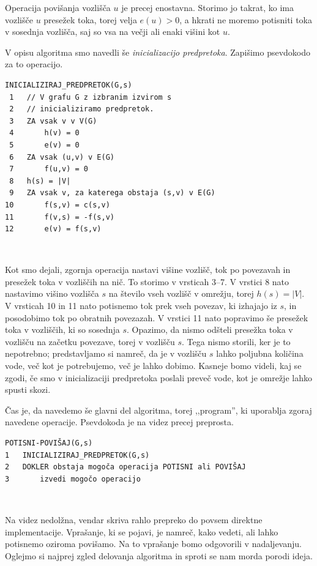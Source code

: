\documentclass[mat1]{fmfdelo}
\begin{document}
Operacija povišanja vozlišča $u$ je precej enostavna. Storimo jo takrat, ko ima vozlišče $u$ presežek toka, torej velja $e(u) > 0$, a hkrati ne moremo potisniti toka v sosednja vozlišča, saj so vsa na večji ali enaki višini kot $u$.

V opisu algoritma smo navedli še \textit{inicializacijo predpretoka}. Zapišimo psevdokodo za to operacijo.\\

\begin{verbatim}
INICIALIZIRAJ_PREDPRETOK(G,s)
 1   // V grafu G z izbranim izvirom s
 2   // inicializiramo predpretok.
 3   ZA vsak v v V(G)
 4       h(v) = 0
 5       e(v) = 0
 6   ZA vsak (u,v) v E(G)
 7       f(u,v) = 0
 8   h(s) = |V|
 9   ZA vsak v, za katerega obstaja (s,v) v E(G)
10       f(s,v) = c(s,v)
11       f(v,s) = -f(s,v)
12       e(v) = f(s,v)
\end{verbatim}~

Kot smo dejali, zgornja operacija nastavi višine vozlišč, tok po povezavah in presežek toka v vozliščih na nič. To storimo v vrsticah 3--7. V vrstici 8 nato nastavimo višino vozlišča $s$ na število vseh vozlišč v omrežju, torej $h(s) = |V|$. V vrsticah 10 in 11 nato potisnemo tok prek vseh povezav, ki izhajajo iz $s$, in posodobimo tok po obratnih povezazah. V vrstici 11 nato popravimo še presežek toka v vozliščih, ki so sosednja $s$. Opazimo, da nismo odšteli presežka toka v vozlišču na začetku povezave, torej v vozlišču $s$. Tega nismo storili, ker je to nepotrebno; predstavljamo si namreč, da je v vozlišču $s$ lahko poljubna količina vode, več kot je potrebujemo, več je lahko dobimo. Kasneje bomo videli, kaj se zgodi, če smo v inicializaciji predpretoka poslali preveč vode, kot je omrežje lahko spusti skozi.

Čas je, da navedemo še glavni del algoritma, torej ,,program'', ki uporablja zgoraj navedene operacije. Psevdokoda je na videz precej preprosta.\\

\begin{verbatim}
POTISNI-POVIŠAJ(G,s)
1   INICIALIZIRAJ_PREDPRETOK(G,s)
2   DOKLER obstaja mogoča operacija POTISNI ali POVIŠAJ
3       izvedi mogočo operacijo
\end{verbatim}~

Na videz nedolžna, vendar skriva rahlo prepreko do povsem direktne implementacije. Vprašanje, ki se pojavi, je namreč, kako vedeti, ali lahko potisnemo oziroma povišamo. Na to vprašanje bomo odgovorili v nadaljevanju. Oglejmo si najprej zgled delovanja algoritma in sproti se nam morda porodi ideja.\\
\end{document}
